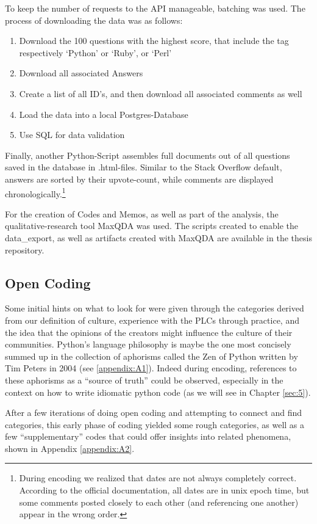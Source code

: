 To keep the number of requests to the API manageable, batching was used. The process of downloading the data was as follows:
\begin{enumerate}
    \item Download the 100 questions with the highest score, that include the tag respectively ‘Python’ or ‘Ruby’, or ‘Perl’
    \item Download all associated Answers
    \item Create a list of all ID’s, and then download all associated comments as well
    \item Load the data into a local Postgres-Database
    \item Use SQL for data validation
\end{enumerate}

Finally, another Python-Script assembles full documents out of all questions saved in the database in .html-files.
Similar to the Stack Overflow default, answers are sorted by their upvote-count, while comments are displayed
chronologically.\footnote[1]{During encoding we realized that dates are not always completely correct.
According to the official documentation, all dates are in unix epoch time, but some comments posted closely to each other
(and referencing one another) appear in the wrong order.}

For the creation of Codes and Memos, as well as part of the analysis, the qualitative-research tool MaxQDA was used.
The scripts created to enable the data\_export, as well as artifacts created with MaxQDA are available in the
thesis repository. \cite[./scripts]{thesis_repo}

\subsection{Open Coding}

Some initial hints on what to look for were given through the categories derived from our definition of culture,
experience with the PLCs through practice, and the idea that the opinions of the creators might influence the culture
of their communities. Python’s language philosophy is maybe the one most concisely summed up in the collection of
aphorisms called the Zen of Python written by Tim Peters in 2004 (see \ref{appendix:A1}). Indeed during encoding, references
to these aphorisms as a “source of truth” could be observed, especially in the context on how to write idiomatic python code
(as we will see in Chapter \ref{sec:5}).

After a few iterations of doing open coding and attempting to connect and find categories, this early phase of coding
yielded some rough categories, as well as a few “supplementary” codes that could offer insights into related phenomena,
shown in Appendix \ref{appendix:A2}.

